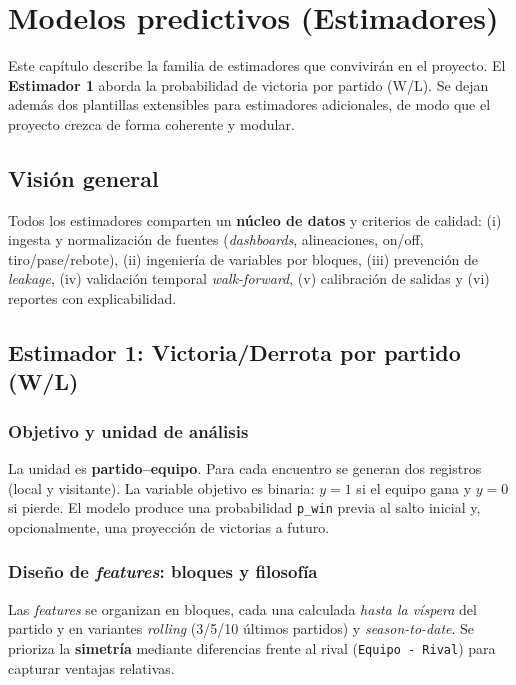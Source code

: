 \chapter{Modelos predictivos (Estimadores)}\label{chap:estimadores}

Este capítulo describe la familia de estimadores que convivirán en el proyecto. 
El \textbf{Estimador 1} aborda la probabilidad de victoria por partido (W/L).
Se dejan además dos plantillas extensibles para estimadores adicionales, de modo que el proyecto crezca de forma coherente y modular.

\section{Visión general}\label{sec:vision-general}
Todos los estimadores comparten un \textbf{núcleo de datos} y criterios de calidad:
(i) ingesta y normalización de fuentes (\textit{dashboards}, alineaciones, on/off, tiro/pase/rebote),
(ii) ingeniería de variables por bloques, (iii) prevención de \textit{leakage}, 
(iv) validación temporal \textit{walk-forward}, (v) calibración de salidas y (vi) reportes con explicabilidad.

\section{Estimador 1: Victoria/Derrota por partido (W/L)}\label{sec:estimador1}

\subsection{Objetivo y unidad de análisis}
La unidad es \textbf{partido–equipo}. Para cada encuentro se generan dos registros (local y visitante).
La variable objetivo es binaria: $y=1$ si el equipo gana y $y=0$ si pierde.
El modelo produce una probabilidad \texttt{p\_win} previa al salto inicial y, opcionalmente, una proyección de victorias a futuro.

\subsection{Diseño de \textit{features}: bloques y filosofía}
Las \textit{features} se organizan en bloques, cada una calculada \emph{hasta la víspera} del partido y en variantes \textit{rolling} (3/5/10 últimos partidos) y \textit{season-to-date}. 
Se prioriza la \textbf{simetría} mediante diferencias frente al rival (\texttt{Equipo - Rival}) para capturar ventajas relativas.

